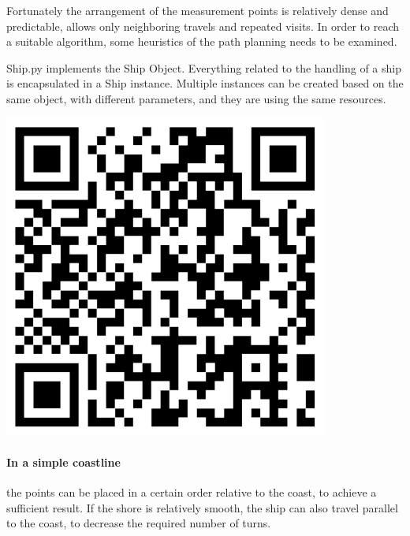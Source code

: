 Fortunately the arrangement of the measurement points is relatively dense and predictable, allows only neighboring travels and repeated visits. In order to reach a suitable algorithm, some heuristics of the path planning needs to be examined.

\begin{tcolorbox}[colback=cyan!5,colframe=cyan!40!black,title=Code: Ship.py \\ https://www.dropbox.com/s/fmtsaatql7jqjhw/Ship\texttt{\_}nofilter.py]
\begin{minipage}{0,6\textwidth}
Ship.py implements the Ship Object. Everything related to the handling of a ship is encapsulated in a Ship instance. Multiple instances can be created based on the same object, with different parameters, and they are using the same resources.
\end{minipage}
\begin{minipage}{0,35\textwidth}
\raggedleft
\includegraphics[width=0.8\textwidth]{img/ship}
\end{minipage}
\end{tcolorbox}

\paragraph{In a simple coastline} the points can be placed in a certain order relative to the coast, to achieve a sufficient result. If the shore is relatively smooth, the ship can also travel parallel to the coast, to decrease the required number of turns.

